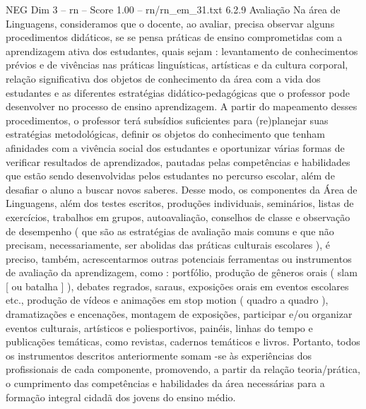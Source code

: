 \begin{textsample}{NEG Dim 3 – rn – Score 1.00 – rn/rn\_em\_31.txt}  \label{ex:f3_neg_197}
6.2.9 Avaliação Na área de Linguagens, consideramos que o docente, ao avaliar, precisa observar alguns procedimentos didáticos, se se pensa práticas de ensino comprometidas com a aprendizagem ativa dos estudantes, quais sejam : levantamento de conhecimentos prévios e de vivências nas práticas linguísticas, artísticas e da cultura corporal, relação significativa dos objetos de conhecimento da área com a vida dos estudantes e as diferentes estratégias didático-pedagógicas que o professor pode desenvolver no processo de ensino aprendizagem.
A partir do mapeamento desses procedimentos, o professor terá subsídios suficientes para (re)planejar suas estratégias metodológicas, definir os objetos do conhecimento que tenham afinidades com a vivência social dos estudantes e oportunizar várias formas de verificar resultados de aprendizados, pautadas pelas competências e habilidades que estão sendo desenvolvidas pelos estudantes no percurso escolar, além de desafiar o aluno a buscar novos saberes.
Desse modo, os componentes da Área de Linguagens, além dos testes escritos, produções individuais, seminários, listas de exercícios, trabalhos em grupos, autoavaliação, conselhos de classe e observação de desempenho ( que são as estratégias de avaliação mais comuns e que não precisam, necessariamente, ser abolidas das práticas culturais escolares ), é preciso, também, acrescentarmos outras potenciais ferramentas ou instrumentos de avaliação da aprendizagem, como : portfólio, produção de gêneros orais ( slam [ ou batalha ] ), debates regrados, saraus, exposições orais em eventos escolares etc., produção de vídeos e animações em stop motion ( quadro a quadro ), dramatizações e encenações, montagem de exposições, participar e/ou organizar eventos culturais, artísticos e poliesportivos, painéis, linhas do tempo e publicações temáticas, como revistas, cadernos temáticos e livros.
Portanto, todos os instrumentos descritos anteriormente somam -se às experiências dos profissionais de cada componente, promovendo, a partir da relação teoria/prática, o cumprimento das competências e habilidades da área necessárias para a formação integral cidadã dos jovens do ensino médio.

\end{textsample}
